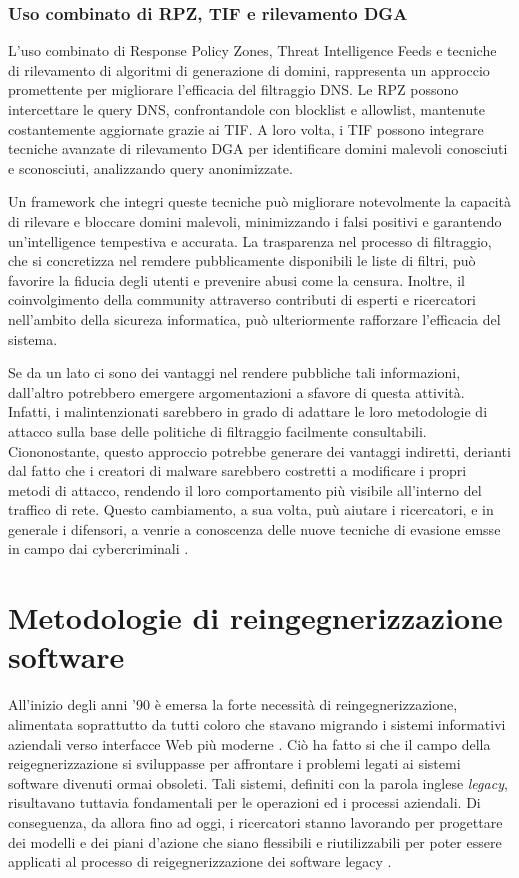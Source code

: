 \subsubsection{Uso combinato di RPZ, TIF e rilevamento DGA}
L'uso combinato di Response Policy Zones, Threat Intelligence Feeds e tecniche di rilevamento di algoritmi di generazione di domini, rappresenta un approccio promettente per migliorare l'efficacia del filtraggio DNS. Le RPZ possono intercettare le query DNS, confrontandole con blocklist e allowlist, mantenute costantemente aggiornate grazie ai TIF. A loro volta, i TIF possono integrare tecniche avanzate di rilevamento DGA per identificare domini malevoli conosciuti e sconosciuti, analizzando query anonimizzate.

Un framework che integri queste tecniche può migliorare notevolmente la capacità di rilevare e bloccare domini malevoli, minimizzando i falsi positivi e garantendo un'intelligence tempestiva e accurata. La trasparenza nel processo di filtraggio, che si concretizza nel remdere pubblicamente disponibili le liste di filtri, può favorire la fiducia degli utenti e prevenire abusi come la censura. Inoltre, il coinvolgimento della community attraverso contributi di esperti e ricercatori nell'ambito della sicureza informatica, può ulteriormente rafforzare l'efficacia del sistema.

Se da un lato ci sono dei vantaggi nel rendere pubbliche tali informazioni, dall'altro potrebbero emergere argomentazioni a sfavore di questa attività. Infatti, i malintenzionati sarebbero in grado di adattare le loro metodologie di attacco sulla base delle politiche di filtraggio facilmente consultabili. Ciononostante, questo approccio potrebbe generare dei vantaggi indiretti, derianti dal fatto che i creatori di malware sarebbero costretti a modificare i propri metodi di attacco, rendendo il loro comportamento più visibile all'interno del traffico di rete. Questo cambiamento, a sua volta, puù aiutare i ricercatori, e in generale i difensori, a venrie a conoscenza delle nuove tecniche di evasione emsse in campo dai cybercriminali \cite{Magnusson2024}.

\section{Metodologie di reingegnerizzazione software}
All'inizio degli anni '90 è emersa la forte necessità di reingegnerizzazione, alimentata soprattutto da tutti coloro che stavano migrando i sistemi informativi aziendali verso interfacce Web più moderne \cite{Chikofsky1990}. Ciò ha fatto si che il campo della reigegnerizzazione si sviluppasse per affrontare i problemi legati ai sistemi software divenuti ormai obsoleti. Tali sistemi, definiti con la parola inglese \emph{legacy}, risultavano tuttavia fondamentali per le operazioni ed i processi aziendali. Di conseguenza, da allora fino ad oggi, i ricercatori stanno lavorando per progettare dei modelli e dei piani d'azione che siano flessibili e riutilizzabili per poter essere applicati al processo di reigegnerizzazione dei software legacy \cite{Majthoub2018}.

